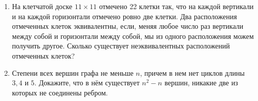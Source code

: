 \documentclass{article}
\begin{document}
\begin{enumerate}[label*=\protect\fbox{\arabic{enumi}}]
\item На клетчатой доске $11 \times 11$ отмечено 22 клетки так, что на каждой вертикали и на каждой горизонтали отмечено ровно две клетки. Два расположения отмеченных клеток эквивалентны, если, меняя любое число раз вертикали между собой и горизонтали между собой, мы из одного расположения можем получить другое. Сколько существует неэквивалентных расположений отмеченных клеток?

\item Степени всех вершин графа не меньше $n$, причем в нем нет циклов длины $3, 4$ и $5$. Докажите, что в нём существует $n^2 - n$ вершин, никакие две из которых не соединены ребром.
 
\end{enumerate}
\end{document}
